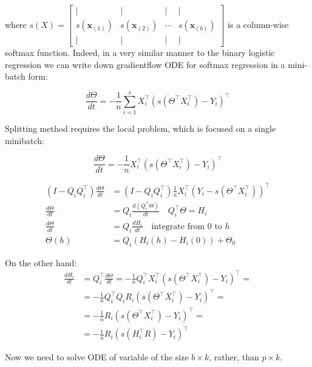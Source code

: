 \documentclass{article}
\newcommand{\vect}[1]{\boldsymbol{\mathbf{#1}}}
\begin{document}
where $s(X) = \left[\begin{array}{cccc}| & | & | & | \\
s(\vect{x}_{(1)}) & s(\vect{x}_{(2)}) & \cdots & s(\vect{x}_{(b)}) \\
| & | & | & |
\end{array}\right]$ is a column-wise softmax function. Indeed, in a very similar manner to the binary logistic regression we can write down gradientflow ODE for softmax regression in a mini-batch form:

\begin{equation}
\frac{d \Theta}{d t} = - \frac{1}{n} \sum_{i=1}^s X_i^\top\left(s(\Theta^\top X_i^\top) - Y_i \right)^\top
\end{equation}

Splitting method requires the local problem, which is focused on a single minibatch:

\begin{equation}
\frac{d \Theta}{d t} = - \frac{1}{n} X_i^\top\left(s(\Theta^\top X_i^\top) - Y_i \right)^\top
\end{equation}

\begin{align}
\nonumber (I - Q_iQ_i^\top)\frac{d \Theta}{d t} &= (I - Q_iQ_i^\top) \frac{1}{n} X_i^\top(Y_i -s(\Theta^\top X_i^\top))^\top \\
\nonumber \frac{d \Theta}{d t} &= Q_i\frac{d (Q_i^\top\Theta)}{d t} \quad Q_i^\top \Theta = H_i \\ 
\nonumber \frac{d \Theta}{d t} &= Q_i\frac{d H_i }{d t} \quad \text{integrate from $0$ to $h$}\\ 
\label{strang:softmax_theta_from_eta}\Theta(h) &= Q_i \left(H_i (h) - H_i (0) \right) + \Theta_0
\end{align}

On the other hand:
\begin{align}\nonumber
\frac{d H_i }{d t} &= Q_i^\top\frac{d \Theta}{d t} =  - \frac{1}{n} Q_i^\top  X_i^\top(s(\Theta^\top X_i^\top) - Y_i)^\top = \\ 
\nonumber&= - \frac{1}{n} Q_i^\top  Q_i R_i(s(\Theta^\top X_i^\top) - Y_i)^\top =\\
\nonumber&= - \frac{1}{n} R_i(s(\Theta^\top X_i^\top) - Y_i)^\top =\\
\nonumber&= - \frac{1}{n} R_i(s(H_i^\top R) - Y_i)^\top 
\end{align}

Now we need to solve ODE of variable of the size $b \times k$, rather, than $p \times k$.
\end{document}
